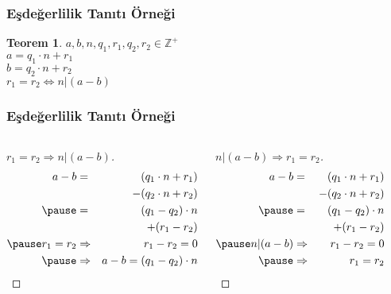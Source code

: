 \documentclass[dvipsnames]{beamer}
\theoremstyle{definition}
\theoremstyle{example}
\theoremstyle{plain}
\newtheorem{teorem}[theorem]{Teorem}
\begin{document}
\begin{frame}
  \frametitle{Eşdeğerlilik Tanıtı Örneği}

  \begin{teorem}
    $a,b,n,q_1,r_1,q_2,r_2 \in \mathbb{Z}^+$\\
    $a = q_1 \cdot n + r_1$\\
    $b = q_2 \cdot n + r_2$\\

    \bigskip
    $r_1 = r_2 \Leftrightarrow n | (a - b)$
  \end{teorem}
\end{frame}

\begin{frame}
  \frametitle{Eşdeğerlilik Tanıtı Örneği}

  \begin{columns}[t]
    \begin{proof}[$r_1 = r_2 \Rightarrow n | (a - b)$]
      \begin{eqnarray*}
        a - b & = & (q_1 \cdot n + r_1)\\
              &   & -(q_2 \cdot n + r_2)\\\pause
              & = & (q_1 - q_2) \cdot n\\
              &   & + (r_1 - r_2)\\\pause
        r_1 = r_2 & \Rightarrow & r_1 - r_2 = 0\\\pause
                  & \Rightarrow & a - b = (q_1 - q_2) \cdot n
      \end{eqnarray*}
    \end{proof}

    \pause
    \begin{proof}[$n | (a - b) \Rightarrow r_1 = r_2$]
      \begin{eqnarray*}
        a - b & = & (q_1 \cdot n + r_1)\\
              &   & -(q_2 \cdot n + r_2)\\\pause
              & = & (q_1 - q_2) \cdot n\\
              &   & + (r_1 - r_2)\\\pause
        n | (a - b) & \Rightarrow & r_1 - r_2 = 0\\\pause
                    & \Rightarrow & r_1 = r_2
      \end{eqnarray*}
    \end{proof}
  \end{columns}
\end{frame}
\end{document}
